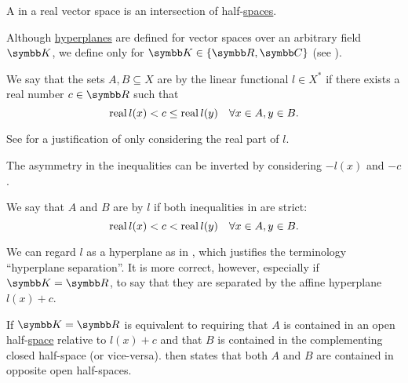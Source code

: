 \begin{definition}\label{def:polyhedron}
  A  in a real vector space is an intersection of half-\hyperref[def:half_space]{spaces}.
\end{definition}

\begin{definition}\label{def:hyperplane_separation}
  Although \hyperref[def:hyperplane]{hyperplanes} are defined for vector spaces over an arbitrary field \( \BK \), we define  only for \( \BK \in \{ \BR, \BC \} \) (see ).

  We say that the sets \( A, B \subseteq X \) are  by the linear functional \( l \in X^* \) if there exists a real number \( c \in \BR \) such that
  \begin{equation}\label{def:hyperplane_separation/normal}
    \operatorname{real} l(x) < c \leq \operatorname{real} l(y) \quad\forall x \in A, y \in B.
  \end{equation}

  See  for a justification of only considering the real part of \( l \).

  The asymmetry in the inequalities  can be inverted by considering \( -l(x) \) and \( -c \).

  We say that \( A \) and \( B \) are  by \( l \) if both inequalities in  are strict:
  \begin{equation}\label{def:hyperplane_separation/strong}
    \operatorname{real} l(x) < c < \operatorname{real} l(y) \quad\forall x \in A, y \in B.
  \end{equation}

  We can regard \( l \) as a hyperplane as in , which justifies the terminology \enquote{hyperplane separation}. It is more correct, however, especially if \( \BK = \BR \), to say that they are separated by the affine hyperplane \( l(x) + c \).

  If \( \BK = \BR \)  is equivalent to requiring that \( A \) is contained in an open half-\hyperref[def:half_space]{space} relative to \( l(x) + c \) and that \( B \) is contained in the complementing closed half-space (or vice-versa).  then states that both \( A \) and \( B \) are contained in opposite open half-spaces.
\end{definition}

